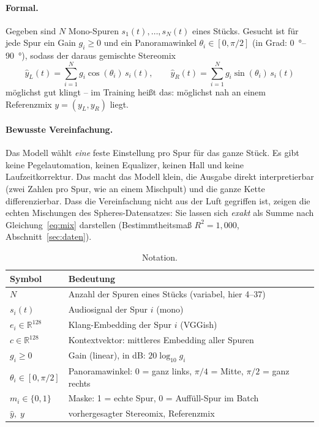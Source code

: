 \documentclass[11pt,a4paper]{article}
\begin{document}
\paragraph{Formal.} Gegeben sind $N$ Mono-Spuren $s_1(t),\dots,s_N(t)$ eines
Stücks. Gesucht ist für jede Spur ein Gain $g_i \ge 0$ und ein Panoramawinkel
$\theta_i \in [0,\pi/2]$ (in Grad: \SIrange{0}{90}{\degree}), sodass der
daraus gemischte Stereomix
\begin{equation}
  \hat y_L(t) = \sum_{i=1}^{N} g_i \cos(\theta_i)\, s_i(t), \qquad
  \hat y_R(t) = \sum_{i=1}^{N} g_i \sin(\theta_i)\, s_i(t)
  \label{eq:mix}
\end{equation}
möglichst gut klingt -- im Training heißt das: möglichst nah an einem
Referenzmix $y = (y_L, y_R)$ liegt.

\paragraph{Bewusste Vereinfachung.} Das Modell wählt \emph{eine} feste
Einstellung pro Spur für das ganze Stück. Es gibt keine Pegelautomation,
keinen Equalizer, keinen Hall und keine Laufzeitkorrektur. Das macht das
Modell klein, die Ausgabe direkt interpretierbar (zwei Zahlen pro Spur, wie
an einem Mischpult) und die ganze Kette differenzierbar. Dass die Vereinfachung
nicht aus der Luft gegriffen ist, zeigen die echten Mischungen des
Spheres-Datensatzes: Sie lassen sich \emph{exakt} als Summe nach
Gleichung~\eqref{eq:mix} darstellen (Bestimmtheitsmaß $R^2 = 1{,}000$,
Abschnitt~\ref{sec:daten}).

\begin{table}[h]
\centering\small
\begin{tabular}{@{}ll@{}}
\toprule
Symbol & Bedeutung \\
\midrule
$N$ & Anzahl der Spuren eines Stücks (variabel, hier 4--37) \\
$s_i(t)$ & Audiosignal der Spur $i$ (mono) \\
$e_i \in \mathbb{R}^{128}$ & Klang-Embedding der Spur $i$ (VGGish) \\
$c \in \mathbb{R}^{128}$ & Kontextvektor: mittleres Embedding aller Spuren \\
$g_i \ge 0$ & Gain (linear), in dB: $20\log_{10} g_i$ \\
$\theta_i \in [0,\pi/2]$ & Panoramawinkel: $0$ = ganz links, $\pi/4$ = Mitte, $\pi/2$ = ganz rechts \\
$m_i \in \{0,1\}$ & Maske: 1 = echte Spur, 0 = Auffüll-Spur im Batch \\
$\hat y,\; y$ & vorhergesagter Stereomix, Referenzmix \\
\bottomrule
\end{tabular}
\caption{Notation.}
\end{table}
\end{document}
